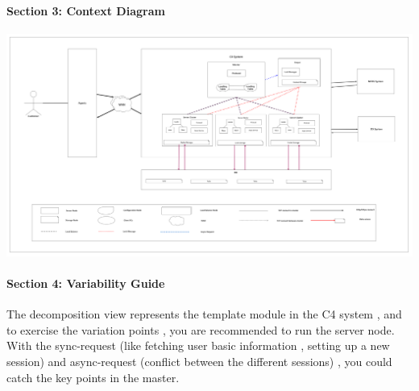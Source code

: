 \documentclass{article}
\begin{document}
			\paragraph{Section 3: Context Diagram}
			\begin{center}
			\includegraphics[scale=0.05]{decom_section2.png}
			\end{center}
			\paragraph{Section 4: Variability Guide}
			The decomposition view represents the template module in the C4 system , and to exercise the variation points , you are recommended to run the server node. With the sync-request (like fetching user basic information , setting up a new session)  and async-request (conflict between the different sessions) , you could catch the key points in the master.
\end{document}
